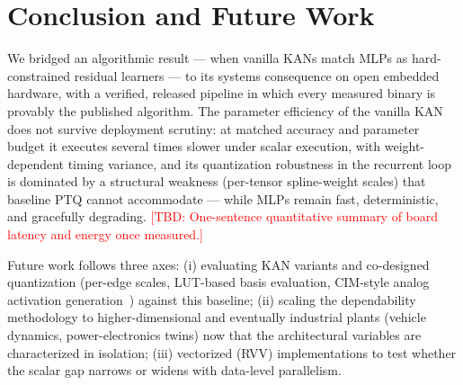 \documentclass[conference]{IEEEtran}
\newcommand{\tbd}[1]{\textcolor{red}{[TBD: #1]}}
\begin{document}
\section{Conclusion and Future Work}
\label{sec:conclusion}

We bridged an algorithmic result --- when vanilla KANs match MLPs as
hard-constrained residual learners --- to its systems consequence on open
embedded hardware, with a verified, released pipeline in which every measured
binary is provably the published algorithm. The parameter efficiency of the
vanilla KAN does not survive deployment scrutiny: at matched accuracy and
parameter budget it executes several times slower under scalar execution,
with weight-dependent timing variance, and its quantization robustness in the
recurrent loop is dominated by a structural weakness (per-tensor spline-weight
scales) that baseline PTQ cannot accommodate --- while MLPs remain fast,
deterministic, and gracefully degrading. \tbd{One-sentence quantitative
summary of board latency and energy once measured.}

Future work follows three axes: (i) evaluating KAN variants and co-designed
quantization (per-edge scales, LUT-based basis evaluation,
CIM-style analog activation generation~\cite{wenCIM_PLACEHOLDER,huang2025hardware})
against this baseline; (ii) scaling the dependability methodology to
higher-dimensional and eventually industrial plants (vehicle dynamics,
power-electronics twins) now that the architectural variables are
characterized in isolation; (iii) vectorized (RVV) implementations to test
whether the scalar gap narrows or widens with data-level parallelism.

\balance


\end{document}
